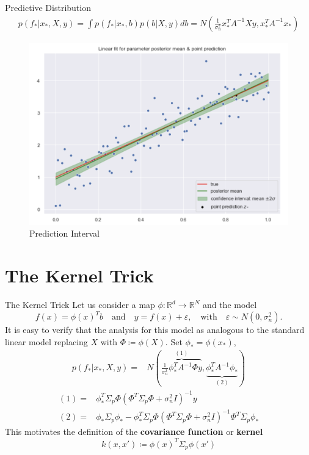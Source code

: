 \documentclass[10pt]{beamer}
\begin{document}
\begin{frame}{Predictive Distribution}{\cite[Chapter 2.1.1]{RW05}}
\begin{align*}
p(f_*|x_*, X, y) 
= \int p(f_*|x_*, b)p(b|X, y)db 
= N\left(
\frac{1}{\sigma_n^2}x_*^T A^{-1}Xy, x_*^T A^{-1}x_*
\right)
\end{align*}

\begin{center}
\begin{figure}
\includegraphics[scale=0.27]{images/lin_prediction.png} 
\caption{Prediction Interval}
\end{figure}
\end{center}
\end{frame}


\section{The Kernel Trick}


\begin{frame}{The Kernel Trick}{\cite[Chapter 2.1.2]{RW05}}
Let us consider a map $\phi: \mathbb{R}^d \longrightarrow \mathbb{R}^N$ and the model
$$
f(x) = \phi(x)^T b \quad \text{and} \quad y = f(x) + \varepsilon, \quad \text{with} \quad \varepsilon \sim N(0, \sigma_n^2). 
$$
It is easy to verify that the analysis for this model as analogous to the standard linear model replacing $X$ with $\Phi\coloneqq \phi(X)$. Set $\phi_*= \phi(x_*)$, 
\begin{align*}
p(f_*|x_*, X, y) =& N\left(
\overbrace{\frac{1}{\sigma_n^2}\phi_*^T A^{-1}\Phi y}^{(1)},
\underbrace{ \phi_*^T A^{-1}\phi_*}_{(2)}
\right)
\end{align*}
\begin{align*}
(1) =& \phi_{*}^T \Sigma_{p}\Phi(\Phi^T \Sigma_p \Phi + \sigma_n^2I)^{-1}y \\
(2)= &\phi_{*}\Sigma_p\phi_{*} - \phi_{*}^T \Sigma_{p}\Phi(\Phi^T \Sigma_p \Phi + \sigma_n^2I)^{-1}\Phi^T\Sigma_p\phi_*
\end{align*}
This motivates the definition of the {\bf covariance function} or {\bf kernel}
$$
k(x, x')\coloneqq \phi(x)^T\Sigma_p\phi(x')
$$
\end{frame}
\end{document}
